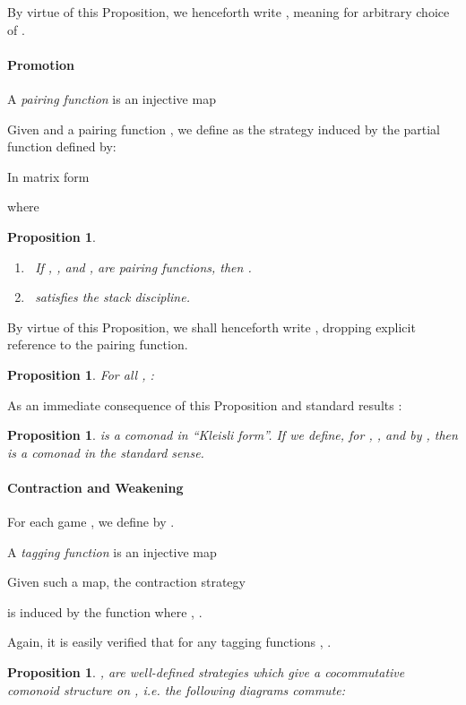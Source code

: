 \documentclass[11pt]{article}
\newtheorem{proposition}[theorem]{Proposition}
\begin{document}
By virtue of this Proposition, we henceforth write , meaning
 for arbitrary choice of .

\paragraph{Promotion}
A {\em pairing function} is an injective map

Given  and a pairing function , we define
 as the strategy induced by the
partial function  defined by:

In matrix form

where


\begin{proposition}
\begin{enumerate}
\item \, If , , and , 
are pairing functions, then .
\item \,  satisfies the stack discipline.
\end{enumerate}
\end{proposition}
By virtue of this Proposition, we shall henceforth write ,
dropping explicit reference to the pairing function.

\begin{proposition}
For all , :

\end{proposition}
As an immediate consequence of this Proposition and standard results
\cite{ManesE:algt}:
\begin{proposition}
 is a comonad in ``Kleisli form''.
If we define, for ,
, and
 by ,
then  is a comonad in the standard sense.
\end{proposition}

\paragraph{Contraction and Weakening}
For each game , we define  by
.

A {\em tagging function} is an injective map

Given such a map, the contraction strategy

is induced by the function
 where , .

Again, it is easily verified that 
for any tagging functions , .

\begin{proposition}
,  are well-defined strategies which give
a cocommutative comonoid structure on , {\em i.e.} the following diagrams
commute:


\end{proposition}
\end{document}
